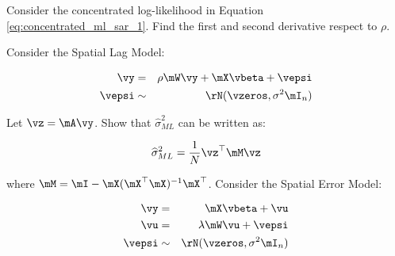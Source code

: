 \documentclass[english,12pt]{book}\usepackage[]{graphicx}\usepackage[]{xcolor}
\begin{document}
\begin{exercises}
    \exercise Consider the concentrated log-likelihood in Equation \eqref{eq:concentrated_ml_sar_1}. Find the first and second derivative respect to $\rho$.
% 
% 
% 
% 
% 

	
    \exercise Consider the Spatial Lag Model:
  
      \begin{eqnarray*}
      \vy & = & \rho\mW\vy +\mX\vbeta + \vepsi \\
      \vepsi & \sim &\rN(\vzeros, \sigma^2\mI_n)
      \end{eqnarray*}
      
      Let $\vz = \mA\vy$. Show that $\widehat{\sigma}^2_{ML}$ can be written as:
      
      \begin{equation*}
      \widehat{\sigma}^2_{ML} = \frac{1}{N}\vz^\top\mM\vz
      \end{equation*}
      
      where $\mM = \mI - \mX(\mX^\top\mX)^{-1}\mX^\top$. 
    \exercise Consider the Spatial Error Model:
	
	\begin{eqnarray*}
		\vy    & = & \mX\vbeta + \vu \label{eq:sac_eq_1}\\
		\vu & = &\lambda\mW\vu + \vepsi\label{eq:sac_eq_2} \\
		\vepsi & \sim &\rN(\vzeros, \sigma^2\mI_n)
	\end{eqnarray*}
	

\end{exercises}
\end{document}
